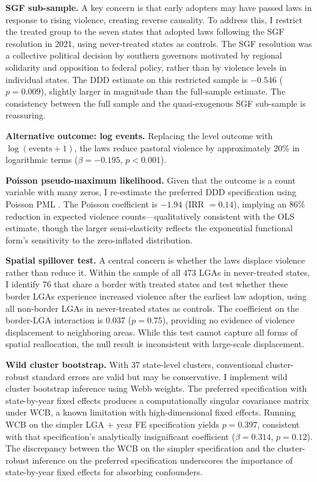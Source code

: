 \documentclass[12pt]{article}
\begin{document}
\textbf{SGF sub-sample.} A key concern is that early adopters may have passed laws in response to rising violence, creating reverse causality. To address this, I restrict the treated group to the seven states that adopted laws following the SGF resolution in 2021, using never-treated states as controls. The SGF resolution was a collective political decision by southern governors motivated by regional solidarity and opposition to federal policy, rather than by violence levels in individual states. The DDD estimate on this restricted sample is $-0.546$ ($p = 0.009$), slightly larger in magnitude than the full-sample estimate. The consistency between the full sample and the quasi-exogenous SGF sub-sample is reassuring.

\textbf{Alternative outcome: log events.} Replacing the level outcome with $\log(\text{events} + 1)$, the laws reduce pastoral violence by approximately 20\% in logarithmic terms ($\beta = -0.195$, $p < 0.001$).

\textbf{Poisson pseudo-maximum likelihood.} Given that the outcome is a count variable with many zeros, I re-estimate the preferred DDD specification using Poisson PML \citep{silva2006log}. The Poisson coefficient is $-1.94$ (IRR $= 0.14$), implying an 86\% reduction in expected violence counts---qualitatively consistent with the OLS estimate, though the larger semi-elasticity reflects the exponential functional form's sensitivity to the zero-inflated distribution.

\textbf{Spatial spillover test.} A central concern is whether the laws displace violence rather than reduce it. Within the sample of all 473 LGAs in never-treated states, I identify 76 that share a border with treated states and test whether these border LGAs experience increased violence after the earliest law adoption, using all non-border LGAs in never-treated states as controls. The coefficient on the border-LGA interaction is 0.037 ($p = 0.75$), providing no evidence of violence displacement to neighboring areas. While this test cannot capture all forms of spatial reallocation, the null result is inconsistent with large-scale displacement.

\textbf{Wild cluster bootstrap.} With 37 state-level clusters, conventional cluster-robust standard errors are valid but may be conservative. I implement wild cluster bootstrap inference using Webb weights. The preferred specification with state-by-year fixed effects produces a computationally singular covariance matrix under WCB, a known limitation with high-dimensional fixed effects. Running WCB on the simpler LGA + year FE specification yields $p = 0.397$, consistent with that specification's analytically insignificant coefficient ($\beta = 0.314$, $p = 0.12$). The discrepancy between the WCB on the simpler specification and the cluster-robust inference on the preferred specification underscores the importance of state-by-year fixed effects for absorbing confounders.
\end{document}
